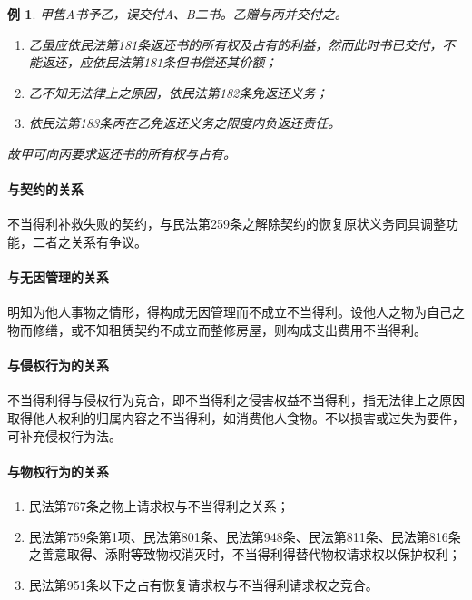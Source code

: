 \documentclass[UTF-8]{ctexrep}
\newcommand{\article}[1]{民法第#1条}
\newcommand{\articlesub}[2]{民法第#1条第#2项}
\newtheorem{ex}{例}
\newcommand{\pA}{{甲}}
\newcommand{\pB}{{乙}}
\newcommand{\pC}{{丙}}
\begin{document}
  \begin{ex}
    \pA 售A书予\pB ，误交付A、B二书。\pB 赠与\pC 并交付之。
    \begin{enumerate}
    \item \pB 虽应依\article{181}返还书的所有权及占有的利益，然而此时书已交付，不能返还，应依\article{181}但书偿还其价额；
    \item \pB 不知无法律上之原因，依\article{182}免返还义务；
    \item 依\article{183}\pC 在\pB 免返还义务之限度内负返还责任。
    \end{enumerate}
    故\pA 可向\pC 要求返还书的所有权与占有。
    \end{ex}
  \paragraph{与契约的关系}不当得利补救失败的契约，与\article{259}之解除契约的恢复原状义务同具调整功能，二者之关系有争议。
  \paragraph{与无因管理的关系}明知为他人事物之情形，得构成无因管理而不成立不当得利。设他人之物为自己之物而修缮，或不知租赁契约不成立而整修房屋，则构成支出费用不当得利。
  \paragraph{与侵权行为的关系}不当得利得与侵权行为竞合，即不当得利之侵害权益不当得利，指无法律上之原因取得他人权利的归属内容之不当得利，如消费他人食物。不以损害或过失为要件，可补充侵权行为法。
  \paragraph{与物权行为的关系}\begin{enumerate}
  \item \article{767}之物上请求权与不当得利之关系；
  \item \articlesub{759}{1}、\article{801}、\article{948}、\article{811}、\article{816}之善意取得、添附等致物权消灭时，不当得利得替代物权请求权以保护权利；
  \item \article{951}以下之占有恢复请求权与不当得利请求权之竞合。
  \end{enumerate}
\end{document}
